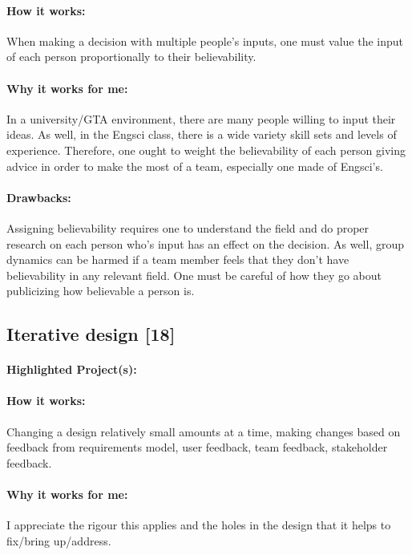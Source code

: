 \documentclass[a4paper,12pt]{article}
\begin{document}
\paragraph{How it works: }
When making a decision with multiple people’s inputs, one must value the input of each person proportionally to their believability.

\paragraph{Why it works for me: }
In a university/GTA environment, there are many people willing to input their ideas. As well, in the Engsci class, there is a wide variety skill sets and levels of experience. Therefore, one ought to weight the believability of each person giving advice in order to make the most of a team, especially one made of Engsci’s.


\paragraph{Drawbacks: }
Assigning believability requires one to understand the field and do proper research on each person who’s input has an effect on the decision. As well, group dynamics can be harmed if a team member feels that they don’t have believability in any relevant field. One must be careful of how they go about publicizing how believable a person is.


\subsection{Iterative design [18]}
\paragraph{Highlighted Project(s): }

\paragraph{How it works: }
Changing a design relatively small amounts at a time, making changes based on feedback from {requirements model, user feedback, team feedback, stakeholder feedback}.

\paragraph{Why it works for me: }
I appreciate the rigour this applies and the holes in the design that it helps to fix/bring up/address.
\end{document}

